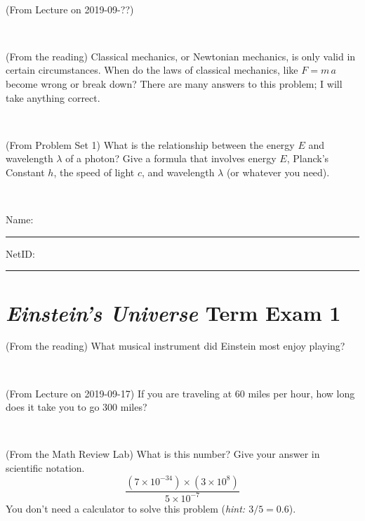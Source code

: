 \documentclass[12pt, letterpaper]{article}
\begin{document}
\vfill ~

\begin{problem} (From Lecture on 2019-09-??)
\end{problem}


\vfill ~

\begin{problem} (From the reading)
Classical mechanics, or Newtonian mechanics, is only valid in certain
circumstances. When do the laws of classical mechanics, like $F =
m\,a$ become wrong or break down? There are many answers to this
problem; I will take anything correct.
\end{problem}


\vfill ~

\begin{problem} (From Problem Set 1)
What is the relationship between the energy $E$ and wavelength
$\lambda$ of a photon? Give a formula that involves energy $E$,
Planck's Constant $h$, the speed of light $c$, and wavelength
$\lambda$ (or whatever you need).
\end{problem}

\vfill ~


\cleardoublepage



\noindent
Name: \rule[-1ex]{0.60\textwidth}{0.1pt}
NetID: \rule[-1ex]{0.20\textwidth}{0.1pt}

\section*{\textsl{Einstein's Universe} Term Exam 1}
\setcounter{problem}{1}


\begin{problem} (From the reading)
What musical instrument did Einstein most enjoy playing?
\end{problem}


\vfill ~

\begin{problem} (From Lecture on 2019-09-17)
If you are traveling at 60 miles per hour, how long does
it take you to go 300 miles?
\end{problem}


\vfill ~

\begin{problem} (From the Math Review Lab)
What is this number? Give your answer in scientific notation.
$$
\frac{(7\times10^{-34})\times(3\times10^8)}{5\times10^{-7}}
$$
You don't need a calculator to solve this problem (\textit{hint: $3/5=0.6$}).
\end{problem}
\end{document}

